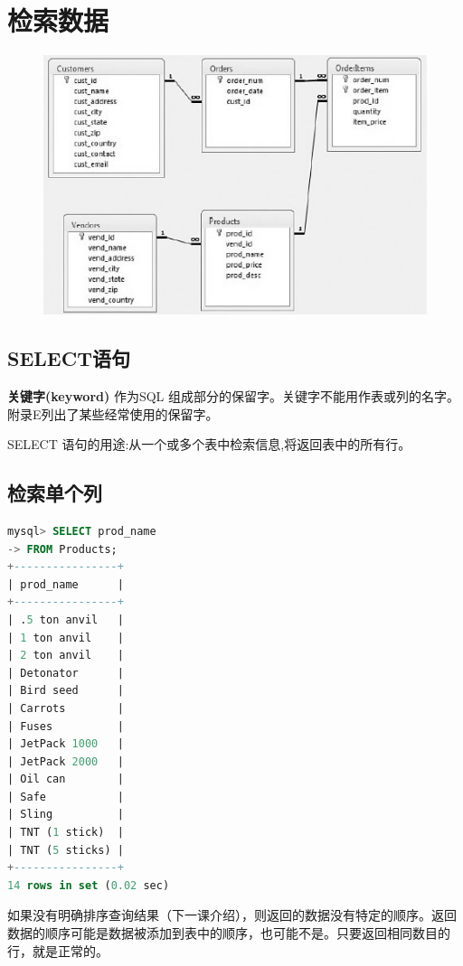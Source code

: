 \documentclass[11pt,a4paper,oneside]{book}
\begin{document}
\chapter{检索数据}
\begin{figure}[H]
	\centering
	\includegraphics[width=\textwidth]{1.png}
\end{figure}
\section{SELECT语句}
\begin{tcolorbox}[colback=blue!7!white,colframe=blue!40]
	\textbf{关键字(keyword)}
	作为SQL 组成部分的保留字。关键字不能用作表或列的名字。附录E列出了某些经常使用的保留字。
\end{tcolorbox}
SELECT 语句的用途:从一个或多个表中检索信息,将返回表中的所有行。

\section{检索单个列}
\begin{lstlisting}[language=sql]
mysql> SELECT prod_name
-> FROM Products;
+----------------+
| prod_name      |
+----------------+
| .5 ton anvil   |
| 1 ton anvil    |
| 2 ton anvil    |
| Detonator      |
| Bird seed      |
| Carrots        |
| Fuses          |
| JetPack 1000   |
| JetPack 2000   |
| Oil can        |
| Safe           |
| Sling          |
| TNT (1 stick)  |
| TNT (5 sticks) |
+----------------+
14 rows in set (0.02 sec)
\end{lstlisting}
如果没有明确排序查询结果（下一课介绍），则返回的数据没有特定的顺序。返回数据的顺序可能是数据被添加到表中的顺序，也可能不是。只要返回相同数目的行，就是正常的。
\end{document}
